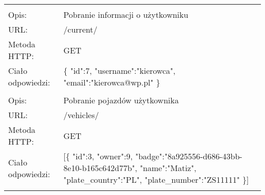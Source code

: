 \begin{longtable}{p{3.5cm}  p{11cm}}
	&\\
	
	Opis:&Pobranie informacji o użytkowniku\\
	URL:&/current/\\
	Metoda HTTP:&GET\\
	Ciało odpowiedzi:&\{\newline
	\-\hspace{1cm}"id":7,\newline
	\-\hspace{1cm}"username":"kierowca",\newline
	\-\hspace{1cm}"email":"kierowca@wp.pl"\newline
	\}\\
	
	&\\
	
	Opis:&Pobranie pojazdów użytkownika\\
	URL:&/vehicles/\\
	Metoda HTTP:&GET\\
	Ciało odpowiedzi:&[\{\newline
	\-\hspace{1cm}"id":3,\newline
	\-\hspace{1cm}"owner":9,\newline
	\-\hspace{1cm}"badge":"8a925556-d686-43bb-8e10-b165c642d77b",\newline
	\-\hspace{1cm}"name":"Matiz",\newline
	\-\hspace{1cm}"plate\_country":"PL",\newline
	\-\hspace{1cm}"plate\_number":"ZS11111"\newline
	\}]\\
	
	&\\
	

\end{longtable}
